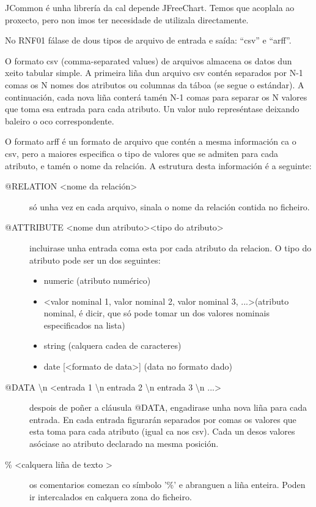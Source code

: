 JCommon é unha librería da cal depende JFreeChart. Temos que acoplala ao proxecto, pero non imos ter necesidade de utilizala directamente.


No RNF01 fálase de dous tipos de arquivo de entrada e saída: ``csv'' e ``arff''.

O formato csv (comma-separated values) de arquivos almacena os datos dun xeito tabular simple. A primeira liña dun arquivo csv contén separados por N-1 comas os N nomes dos atributos ou columnas da táboa (se segue o estándar). A continuación, cada nova liña conterá tamén N-1 comas para separar os N valores que toma esa entrada para cada atributo. Un valor nulo represéntase deixando baleiro o oco correspondente.

O formato arff \cite{arff} é un formato de arquivo que contén a mesma información ca o csv, pero a maiores especifica o tipo de valores que se admiten para cada atributo, e tamén o nome da relación. A estrutura desta información é a seguinte:

\begin{description}
\item[@RELATION \textless nome da relación\textgreater] só unha vez en cada arquivo, sinala o nome da relación contida no ficheiro.
\item[@ATTRIBUTE \textless nome dun atributo\textgreater \textless tipo do atributo\textgreater] incluirase unha entrada coma esta por cada atributo da relacion. O tipo do atributo pode ser un dos seguintes:
\begin{itemize}
\item numeric (atributo numérico)
\item \textless valor nominal 1, valor nominal 2, valor nominal 3, ...\textgreater (atributo nominal, é dicir, que só pode tomar un dos valores nominais especificados na lista)
\item string (calquera cadea de caracteres)
\item date [\textless formato de data\textgreater ] (data no formato dado)
\end{itemize} 
\item[@DATA \textbackslash n \textless entrada 1 \textbackslash n entrada 2 \textbackslash n entrada 3 \textbackslash n ...\textgreater] despois de poñer a cláusula @DATA, engadirase unha nova liña para cada entrada. En cada entrada figurarán separados por comas os valores que esta toma para cada atributo (igual ca nos csv). Cada un desos valores asóciase ao atributo declarado na mesma posición.
\item[\% \textless calquera liña de texto \textgreater] os comentarios comezan co símbolo '\%' e abranguen a liña enteira. Poden ir intercalados en calquera zona do ficheiro.
\end{description} 

